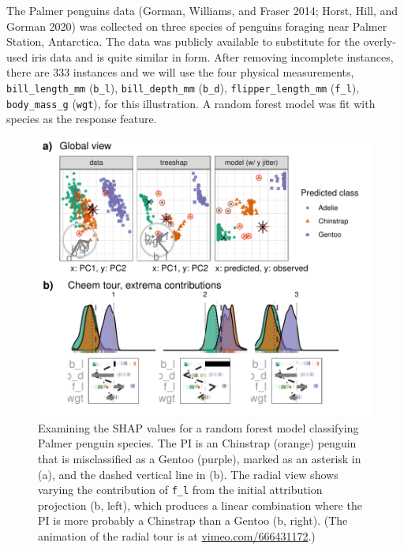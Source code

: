 \documentclass[
]{article}
\begin{document}
The Palmer penguins data (Gorman, Williams, and Fraser 2014; Horst, Hill, and Gorman 2020) was collected on three species of penguins foraging near Palmer Station, Antarctica. The data was publicly available to substitute for the overly-used iris data and is quite similar in form. After removing incomplete instances, there are 333 instances and we will use the four physical measurements, \texttt{bill\_length\_mm} (\texttt{b\_l}), \texttt{bill\_depth\_mm} (\texttt{b\_d}), \texttt{flipper\_length\_mm} (\texttt{f\_l}), \texttt{body\_mass\_g} (\texttt{wgt}), for this illustration. A random forest model was fit with species as the response feature.



\begin{figure}

{\centering \includegraphics[width=1\linewidth]{./figures/case_penguins} 

}

\caption{Examining the SHAP values for a random forest model classifying Palmer penguin species. The PI is an Chinstrap (orange) penguin that is misclassified as a Gentoo (purple), marked as an asterisk in (a), and the dashed vertical line in (b). The radial view shows varying the contribution of \texttt{f\_l} from the initial attribution projection (b, left), which produces a linear combination where the PI is more probably a Chinstrap than a Gentoo (b, right). (The animation of the radial tour is at \href{https://vimeo.com/666431172}{vimeo.com/666431172}.)}\label{fig:casepenguins}
\end{figure}
\end{document}
